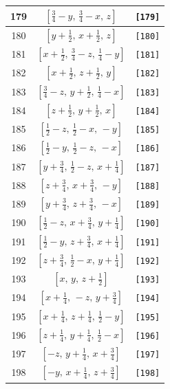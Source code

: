 \documentclass[fleqn,8pt]{jsarticle}
\begin{document}
\begin{longtable}{ccc}
179 & $\left[ \frac{3}{4} - y,\, \frac{3}{4} - x,\, z \right]$ & {\tt [179]} \\ \hline
180 & $\left[ y + \frac{1}{2},\, x + \frac{1}{2},\, z \right]$ & {\tt [180]} \\ \hline
181 & $\left[ x + \frac{1}{2},\, \frac{3}{4} - z,\, \frac{1}{4} - y \right]$ & {\tt [181]} \\ \hline
182 & $\left[ x + \frac{1}{2},\, z + \frac{1}{2},\, y \right]$ & {\tt [182]} \\ \hline
183 & $\left[ \frac{3}{4} - z,\, y + \frac{1}{2},\, \frac{1}{4} - x \right]$ & {\tt [183]} \\ \hline
184 & $\left[ z + \frac{1}{2},\, y + \frac{1}{2},\, x \right]$ & {\tt [184]} \\ \hline
185 & $\left[ \frac{1}{2} - z,\, \frac{1}{2} - x,\, - y \right]$ & {\tt [185]} \\ \hline
186 & $\left[ \frac{1}{2} - y,\, \frac{1}{2} - z,\, - x \right]$ & {\tt [186]} \\ \hline
187 & $\left[ y + \frac{3}{4},\, \frac{1}{2} - z,\, x + \frac{1}{4} \right]$ & {\tt [187]} \\ \hline
188 & $\left[ z + \frac{3}{4},\, x + \frac{3}{4},\, - y \right]$ & {\tt [188]} \\ \hline
189 & $\left[ y + \frac{3}{4},\, z + \frac{3}{4},\, - x \right]$ & {\tt [189]} \\ \hline
190 & $\left[ \frac{1}{2} - z,\, x + \frac{3}{4},\, y + \frac{1}{4} \right]$ & {\tt [190]} \\ \hline
191 & $\left[ \frac{1}{2} - y,\, z + \frac{3}{4},\, x + \frac{1}{4} \right]$ & {\tt [191]} \\ \hline
192 & $\left[ z + \frac{3}{4},\, \frac{1}{2} - x,\, y + \frac{1}{4} \right]$ & {\tt [192]} \\ \hline
193 & $\left[ x,\, y,\, z + \frac{1}{2} \right]$ & {\tt [193]} \\ \hline
194 & $\left[ x + \frac{1}{4},\, - z,\, y + \frac{3}{4} \right]$ & {\tt [194]} \\ \hline
195 & $\left[ x + \frac{1}{4},\, z + \frac{1}{4},\, \frac{1}{2} - y \right]$ & {\tt [195]} \\ \hline
196 & $\left[ z + \frac{1}{4},\, y + \frac{1}{4},\, \frac{1}{2} - x \right]$ & {\tt [196]} \\ \hline
197 & $\left[ - z,\, y + \frac{1}{4},\, x + \frac{3}{4} \right]$ & {\tt [197]} \\ \hline
198 & $\left[ - y,\, x + \frac{1}{4},\, z + \frac{3}{4} \right]$ & {\tt [198]} \\ \hline

\end{longtable}
\end{document}
